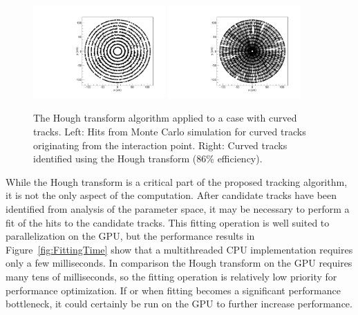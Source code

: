 \documentclass{JINST}
\begin{document}
\begin{figure}[!Hhtb]
\begin{center}
	\includegraphics[width=0.45\textwidth]{figs/curved_500events_hits.pdf}
	\includegraphics[width=0.45\textwidth]{figs/curved_500events_hits_tracks.pdf}
	\caption{The Hough transform algorithm applied to a case with curved tracks. Left: Hits from Monte Carlo
	simulation for curved tracks originating from the interaction point. Right: Curved tracks identified using the
	Hough transform (86\% efficiency). \label{fig:hough_curved}}
\end{center}
\end{figure}

While the Hough transform is a critical part of the proposed tracking algorithm, it is not the only aspect of the computation.  After candidate tracks have been 
identified from analysis of the parameter space, it may be necessary to perform a fit of the hits to the candidate tracks.  This fitting operation is well suited
 to parallelization on the GPU, but the performance results in Figure~\ref{fig:FittingTime} show that a multithreaded CPU implementation
 requires only a few milliseconds.  In comparison the Hough transform on the GPU requires many tens of milliseconds, so the fitting operation is relatively low priority for performance optimization.  If or when fitting becomes a significant performance bottleneck, it could certainly be run on the GPU to further increase performance.
\end{document}

